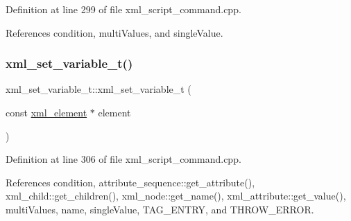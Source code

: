 Definition at line 299 of file xml\+\_\+script\+\_\+command.\+cpp.



References condition, multi\+Values, and single\+Value.

\mbox{\label{classxml__set__variable__t_a9a9810530716baade8f970b659470119}} 
\subsubsection{\texorpdfstring{xml\+\_\+set\+\_\+variable\+\_\+t()}{xml\_set\_variable\_t()}\hspace{0.1cm}{\footnotesize\ttfamily [2/2]}}
{\footnotesize\ttfamily xml\+\_\+set\+\_\+variable\+\_\+t\+::xml\+\_\+set\+\_\+variable\+\_\+t (\begin{DoxyParamCaption}\item[{const \hyperlink{classxml__element}{xml\+\_\+element} $\ast$}]{element }\end{DoxyParamCaption})\hspace{0.3cm}{\ttfamily [explicit]}}



Definition at line 306 of file xml\+\_\+script\+\_\+command.\+cpp.



References condition, attribute\+\_\+sequence\+::get\+\_\+attribute(), xml\+\_\+child\+::get\+\_\+children(), xml\+\_\+node\+::get\+\_\+name(), xml\+\_\+attribute\+::get\+\_\+value(), multi\+Values, name, single\+Value, T\+A\+G\+\_\+\+E\+N\+T\+RY, and T\+H\+R\+O\+W\+\_\+\+E\+R\+R\+OR.

